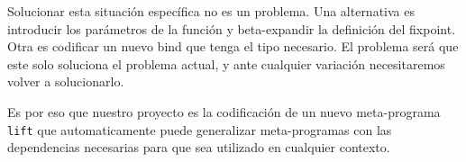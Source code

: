 Solucionar esta situación específica no es un problema. Una alternativa es
introducir los parámetros de la función y beta-expandir la definición del fixpoint.
Otra es codificar un nuevo bind que tenga el tipo necesario.
El problema será que este solo soluciona el problema actual, y ante cualquier
variación necesitaremos volver a solucionarlo.

Es por eso que nuestro proyecto es la codificación de un nuevo meta-programa
\lstinline{lift} que automaticamente puede generalizar meta-programas con las
dependencias necesarias para que sea utilizado en cualquier contexto.
